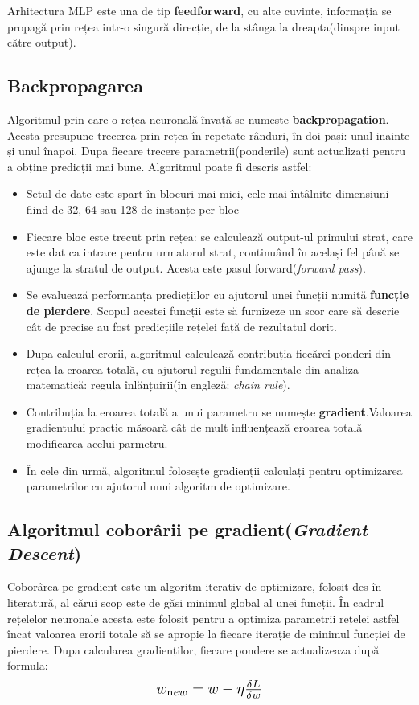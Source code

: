 Arhitectura MLP este una de tip \textbf{feedforward}, cu alte cuvinte, informația se propagă prin rețea intr-o singură direcție, de la stânga la dreapta(dinspre input către output).

\subsection{Backpropagarea}

Algoritmul prin care o rețea neuronală învață se numește \textbf{backpropagation}. Acesta presupune trecerea prin rețea în repetate rânduri, în doi pași: unul inainte și unul înapoi. Dupa fiecare trecere parametrii(ponderile) sunt actualizați pentru a obține predicții mai bune.
Algoritmul poate fi descris astfel:
\begin{itemize}
    \item Setul de date este spart în blocuri mai mici, cele mai întâlnite dimensiuni fiind de 32, 64 sau 128 de instanțe per bloc
    \item Fiecare bloc este trecut prin rețea: se calculează output-ul primului strat, care este dat ca intrare pentru urmatorul strat, continuând în același fel până se ajunge la stratul de output. Acesta este pasul forward(\textit{forward pass}).
    \item Se evaluează performanța predicțiilor cu ajutorul unei funcții numită \textbf{funcție de pierdere}. Scopul acestei funcții este să furnizeze un scor care să descrie cât de precise au fost predicțiile rețelei față de rezultatul dorit. 
    \item Dupa calculul erorii, algoritmul calculează contribuția fiecărei ponderi din rețea la eroarea totală, cu ajutorul regulii fundamentale din analiza matematică: regula înlănțuirii(în engleză: \textit{chain rule}).
    \item Contribuția la eroarea totală a unui parametru se numește \textbf{gradient}.Valoarea gradientului practic măsoară cât de mult influențează eroarea totală modificarea acelui parmetru.
    \item În cele din urmă, algoritmul folosește gradienții calculați pentru optimizarea parametrilor cu ajutorul unui algoritm de optimizare.
\end{itemize}
\newpage
\subsection{Algoritmul coborârii pe gradient(\textit{Gradient Descent})}

Coborârea pe gradient este un algoritm iterativ de optimizare, folosit des în literatură, al cărui scop este de găsi minimul global al unei funcții. În cadrul rețelelor neuronale acesta este folosit pentru a optimiza parametrii rețelei astfel încat valoarea erorii totale să se apropie la fiecare iterație de minimul funcției de pierdere. Dupa calcularea gradienților, fiecare pondere se actualizeaza după formula: 
\[
    \scalebox{1.3}{$w_{\text new} = w - \eta \frac{\delta L}{\delta w}$}
\]

